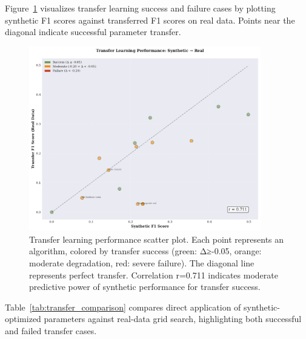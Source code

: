 \documentclass[journal,article,submit,pdftex,moreauthors]{Definitions/mdpi}
\begin{document}
Figure~\ref{fig:transfer_scatter} visualizes transfer learning success and failure cases by plotting synthetic F1 scores against transferred F1 scores on real data. Points near the diagonal indicate successful parameter transfer.

\begin{figure}[ht]
\centering
\includegraphics[width=0.9\textwidth]{figures/fig_transfer_learning_scatter.pdf}
\caption{Transfer learning performance scatter plot. Each point represents an algorithm, colored by transfer success (green: Δ≥-0.05, orange: moderate degradation, red: severe failure). The diagonal line represents perfect transfer. Correlation r=0.711 indicates moderate predictive power of synthetic performance for transfer success.}
\label{fig:transfer_scatter}
\end{figure}

Table~\ref{tab:transfer_comparison} compares direct application of synthetic-optimized parameters against real-data grid search, highlighting both successful and failed transfer cases.
\end{document}
